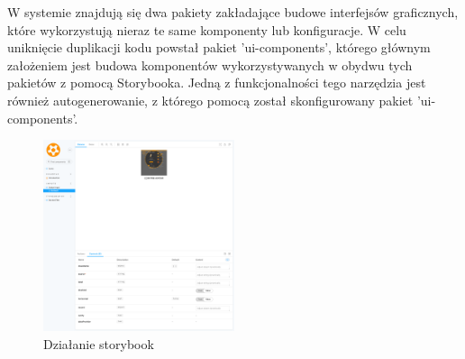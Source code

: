 W systemie znajdują się dwa pakiety zakładające budowe interfejsów graficznych, które wykorzystują nieraz te same komponenty lub konfiguracje. W celu uniknięcie duplikacji kodu powstał pakiet 'ui-components', którego głównym założeniem jest budowa komponentów wykorzystywanych w obydwu tych pakietów z pomocą Storybooka. Jedną z funkcjonalności tego narzędzia jest również autogenerowanie, z którego pomocą został skonfigurowany pakiet 'ui-components'. 

\begin{figure}[h!]
    \centering
    \includegraphics[width=0.5\textwidth]{images/ui-components/storybook.png}
    \caption{Działanie storybook}
    \label{fig:storybook}
\end{figure}
